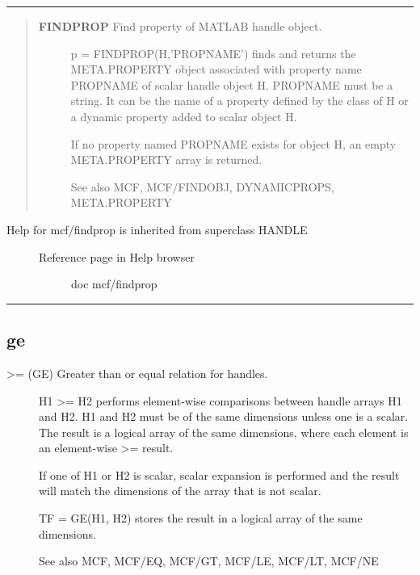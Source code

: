 \documentclass[letterpaper,10pt,english]{sphinxmanual}
\begin{document}
\bigskip\hrule{}\bigskip

\label{classes/utils/@mcf/mcf:findprop}\begin{quote}
\begin{description}
\item[{\textbf{FINDPROP}   Find property of MATLAB handle object.}] \leavevmode
p = FINDPROP(H,'PROPNAME') finds and returns the META.PROPERTY object
associated with property name PROPNAME of scalar handle object H.
PROPNAME must be a string.  It can be the name of a property defined
by the class of H or a dynamic property added to scalar object H.

If no property named PROPNAME exists for object H, an empty
META.PROPERTY array is returned.

See also MCF, MCF/FINDOBJ, DYNAMICPROPS, META.PROPERTY

\end{description}
\end{quote}
\begin{description}
\item[{Help for mcf/findprop is inherited from superclass HANDLE}] \leavevmode\begin{description}
\item[{Reference page in Help browser}] \leavevmode
doc mcf/findprop

\end{description}

\end{description}


\bigskip\hrule{}\bigskip



\subsection{ge}
\label{classes/utils/@mcf/mcf:ge}\label{classes/utils/@mcf/mcf:id2}\begin{description}
\item[{\textgreater{}= (GE)   Greater than or equal relation for handles.}] \leavevmode
H1 \textgreater{}= H2 performs element-wise comparisons between handle arrays H1 and
H2.  H1 and H2 must be of the same dimensions unless one is a scalar.
The result is a logical array of the same dimensions, where each
element is an element-wise \textgreater{}= result.

If one of H1 or H2 is scalar, scalar expansion is performed and the
result will match the dimensions of the array that is not scalar.

TF = GE(H1, H2) stores the result in a logical array of the same
dimensions.

See also MCF, MCF/EQ, MCF/GT, MCF/LE, MCF/LT, MCF/NE

\end{description}
\end{document}
